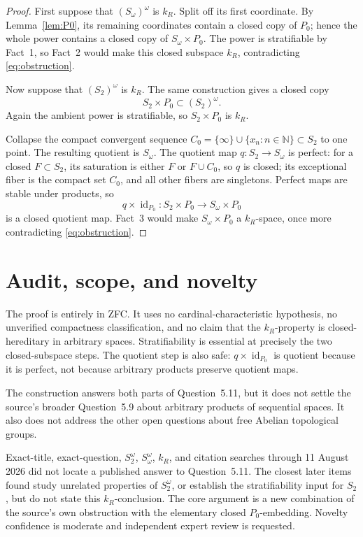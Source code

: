 \documentclass[11pt]{article}
\newcommand{\N}{\mathbb N}
\begin{document}
\begin{proof}
First suppose that $(S_\omega)^\omega$ is $k_R$.  Split off its first
coordinate.  By Lemma~\ref{lem:P0}, its remaining coordinates contain a
closed copy of $P_0$; hence the whole power contains a closed copy of
$S_\omega\times P_0$.  The power is stratifiable by Fact~1, so Fact~2
would make this closed subspace $k_R$, contradicting
\eqref{eq:obstruction}.

Now suppose that $(S_2)^\omega$ is $k_R$.  The same construction gives a
closed copy
\[
                   S_2\times P_0\subset (S_2)^\omega.
\]
Again the ambient power is stratifiable, so $S_2\times P_0$ is $k_R$.

Collapse the compact convergent sequence
$C_0=\{\infty\}\cup\{x_n:n\in\N\}\subset S_2$ to one point.  The resulting
quotient is $S_\omega$.  The quotient map
\(q:S_2\to S_\omega\) is perfect: for a closed $F\subset S_2$, its
saturation is either $F$ or $F\cup C_0$, so $q$ is closed; its exceptional
fiber is the compact set $C_0$, and all other fibers are singletons.  Perfect maps
are stable under products, so
\[
       q\times\operatorname{id}_{P_0}:S_2\times P_0
          \longrightarrow S_\omega\times P_0
\]
is a closed quotient map.  Fact~3 would make $S_\omega\times P_0$ a
$k_R$-space, once more contradicting \eqref{eq:obstruction}.
\end{proof}

\section{Audit, scope, and novelty}

The proof is entirely in ZFC.  It uses no cardinal-characteristic
hypothesis, no unverified compactness classification, and no claim that the
$k_R$-property is closed-hereditary in arbitrary spaces.  Stratifiability
is essential at precisely the two closed-subspace steps.  The quotient step
is also safe: $q\times\operatorname{id}_{P_0}$ is quotient because it is
perfect, not because arbitrary products preserve quotient maps.

The construction answers both parts of Question~5.11, but it does not settle
the source's broader Question~5.9 about arbitrary products of sequential
spaces.  It also does not address the other open questions about free
Abelian topological groups.

Exact-title, exact-question, $S_2^\omega$, $S_\omega^\omega$, $k_R$,
and citation searches through 11 August 2026 did not locate a published
answer to Question~5.11.  The closest later items found study unrelated
properties of $S_2^\omega$, or establish the stratifiability input for
$S_2$, but do not state this $k_R$-conclusion.  The core argument is a
new combination of the source's own obstruction with the elementary closed
$P_0$-embedding.  Novelty confidence is moderate and independent expert
review is requested.
\end{document}
